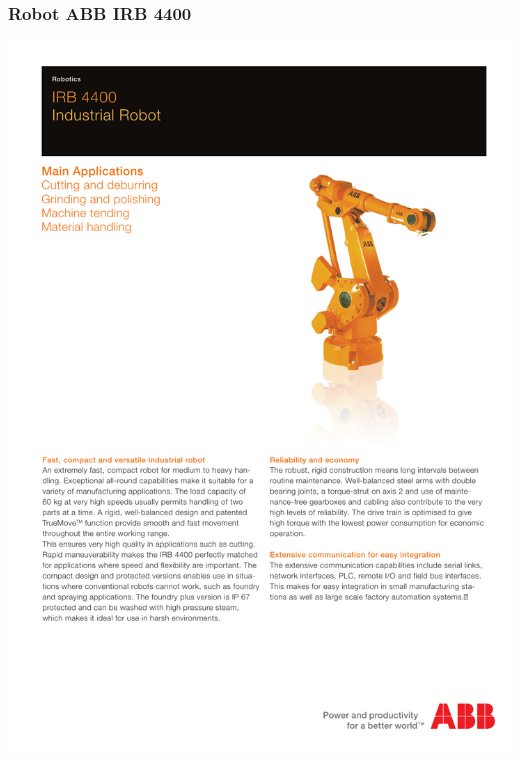 \subsubsection{Robot ABB IRB 4400}
\hspace*{-2cm}
\includegraphics[page=2]{Datasheets/IRB-4400.pdf}
\newpage

